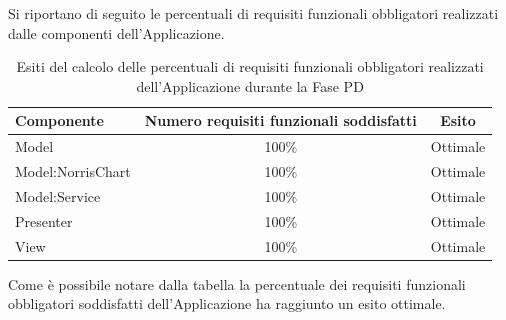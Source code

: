 				Si riportano di seguito le percentuali di requisiti funzionali obbligatori realizzati dalle componenti dell'Applicazione.
				\begin{table}[H]
					\centering
						\begin{tabu}{| l | c | c |}
							\hline
							Componente	& Numero requisiti funzionali soddisfatti	& Esito		\\ \hline \hline
							Model				&   100\% 	& Ottimale \\ \hline
							Model:NorrisChart	&   100\% 	& Ottimale  \\ \hline
							Model:Service 		& 	100\%	& Ottimale   \\ \hline
							Presenter  			& 	100\%	& Ottimale  \\ \hline
							View  				& 	100\%	& Ottimale  \\ \hline
						\end{tabu}
					\caption{Esiti del calcolo delle percentuali di requisiti funzionali obbligatori realizzati dell'Applicazione durante la Fase PD}
				\end{table}
				Come è possibile notare dalla tabella la percentuale dei requisiti funzionali obbligatori soddisfatti dell'Applicazione ha raggiunto un esito ottimale.


